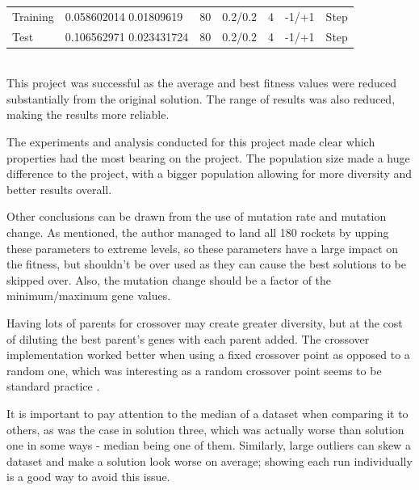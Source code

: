 \documentclass[sigconf]{acmart}
\begin{document}
%
\begin{supertabular}{@{}p{0.1\columnwidth}p{0.15\columnwidth}p{0.05\columnwidth}p{0.1\columnwidth}p{0.1\columnwidth}p{0.1\columnwidth}p{0.1\columnwidth}}
    Training&0.058602014 0.01809619&80&0.2/0.2&4&-1/+1&Step\\
    Test&0.106562971 0.023431724&80&0.2/0.2&4&-1/+1&Step\\
    
\end{supertabular}%
\\

This project was successful as the average and best fitness values were reduced substantially from the original solution. The range of results was also reduced, making the results more reliable.

The experiments and analysis conducted for this project made clear which properties had the most bearing on the project. The population size made a huge difference to the project, with a bigger population allowing for more diversity and better results overall.

Other conclusions can be drawn from the use of mutation rate and mutation change. As mentioned, the author managed to land all 180 rockets by upping these parameters to extreme levels, so these parameters have a large impact on the fitness, but shouldn't be over used as they can cause the best solutions to be skipped over. Also, the mutation change should be a factor of the minimum/maximum gene values.

Having lots of parents for crossover may create greater diversity, but at the cost of diluting the best parent's genes with each parent added. The crossover implementation worked better when using a fixed crossover point as opposed to a random one, which was interesting as a random crossover point seems to be standard practice \cite{singlePoint}.

It is important to pay attention to the median of a dataset when comparing it to others, as was the case in solution three, which was actually worse than solution one in some ways - median being one of them. Similarly, large outliers can skew a dataset and make a solution look worse on average; showing each run individually is a good way to avoid this issue.
\end{document}
